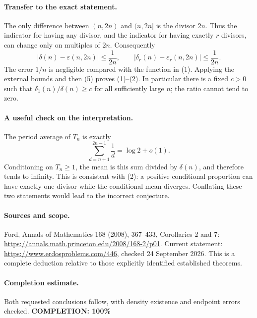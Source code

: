 \paragraph{Transfer to the exact statement.}
The only difference between \((n,2n)\) and \((n,2n]\) is the divisor
\(2n\). Thus the indicator for having any divisor, and the indicator
for having exactly \(r\) divisors, can change only on multiples of \(2n\).
Consequently
\[
 |\delta(n)-\varepsilon(n,2n)|\leq\frac1{2n},\qquad
 |\delta_r(n)-\varepsilon_r(n,2n)|\leq\frac1{2n}.
 \tag{5}
\]
The error \(1/n\) is negligible compared with the function in (1).
Applying the external bounds and then (5) proves (1)--(2).
In particular there is a fixed \(c>0\) such that
\(\delta_1(n)/\delta(n)\geq c\) for all sufficiently large \(n\);
the ratio cannot tend to zero.

\paragraph{A useful check on the interpretation.}
The period average of \(T_n\) is exactly
\[
 \sum_{d=n+1}^{2n-1}\frac1d=\log2+o(1).
\]
Conditioning on \(T_n\geq1\), the mean is this sum divided by
\(\delta(n)\), and therefore tends to infinity.
This is consistent with (2): a positive conditional proportion can
have exactly one divisor while the conditional mean diverges.
Conflating these two statements would lead to the incorrect conjecture.

\paragraph{Sources and scope.}
Ford, Annals of Mathematics 168 (2008), 367--433, Corollaries 2 and 7:
\url{https://annals.math.princeton.edu/2008/168-2/p01}.
Current statement: \url{https://www.erdosproblems.com/446},
checked 24 September 2026. This is a complete deduction relative to
those explicitly identified established theorems.

\paragraph{Completion estimate.}
Both requested conclusions follow, with density existence and endpoint errors checked.
\textbf{COMPLETION: 100\%}
